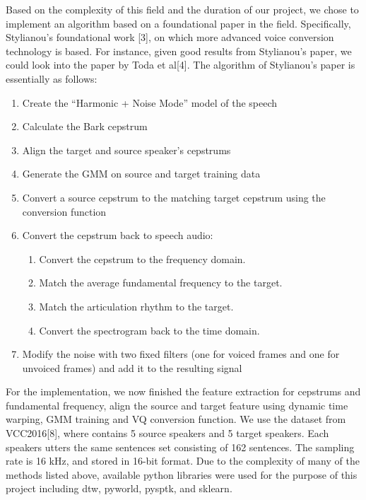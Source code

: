 \documentclass{article}
\begin{document}
Based on the complexity of this field and the duration of our project, we chose to implement an algorithm based on a foundational paper in the field. Specifically, Stylianou's foundational work [3], on which more advanced voice conversion technology is based. For instance, given good results from Stylianou's paper, we could look into the paper by Toda et al[4].  The algorithm of Stylianou's paper is essentially as follows:
\begin{enumerate}
\item Create the ``Harmonic + Noise Mode'' model of the speech

\item Calculate the Bark cepstrum

\item Align the target and source speaker's cepstrums

\item Generate the GMM on source and target training data

\item Convert a source cepstrum to the matching target cepstrum using the conversion function
\item Convert the cepstrum back to speech audio:
\begin{enumerate}
\item Convert the cepstrum to the frequency domain.
\item Match the average fundamental frequency to the target.
\item Match the articulation rhythm to the target.
\item Convert the spectrogram back to the time domain.
\end{enumerate}

\item Modify the noise with two fixed filters (one for voiced frames and one for unvoiced frames) and add it to the resulting signal
\end{enumerate}

For the implementation, we now finished the feature extraction for cepstrums and fundamental frequency, align the source and target feature using dynamic time warping, GMM training and VQ conversion function. We use the dataset from VCC2016[8], where contains 5 source speakers and 5 target speakers. Each speakers utters the same sentences set consisting of 162 sentences. The sampling rate is 16 kHz, and stored in 16-bit format. Due to the complexity of many of the methods listed above, available python libraries were used for the purpose of this project including dtw, pyworld, pysptk, and sklearn.
\end{document}
